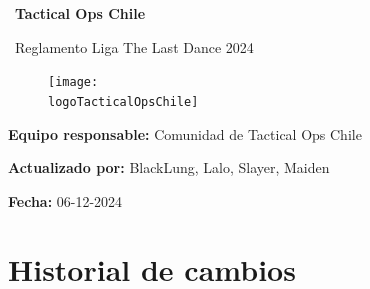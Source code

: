 \documentclass[a4paper, 11pt]{article}
\newcommand{\logoTacticalOpsChile}{img/logo_tacticalops.png}
\newcommand{\nombreInforme}{Tactical Ops Chile}
\begin{document}
\rfoot[]{\thepage} %

    \begin{titlepage}
        \begin{center}
            {\Huge\ \textbf{\nombreInforme}}\par
            {\huge\ Reglamento Liga The Last Dance 2024}\par          
        \end{center}

        \vfill

        \begin{figure}[htb]
            \centering
            \texttt{[image: \\logoTacticalOpsChile]}
        \end{figure} 
        
        \vfill

        \textbf{Equipo responsable: } Comunidad de Tactical Ops Chile\par\vspace{0.2cm}
        \textbf{Actualizado por: } BlackLung, Lalo, Slayer, Maiden\par\vspace{0.2cm}
        \textbf{Fecha: } 06-12-2024\par\vspace{0.3cm}

    \end{titlepage}
    \clearpage

    \tableofcontents
    \clearpage


    \section{Historial de cambios}
    
\end{document}
